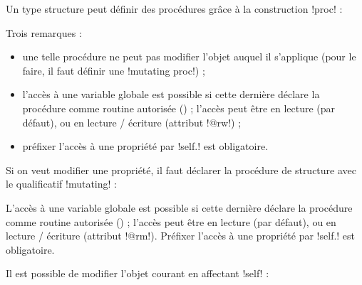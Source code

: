 
Un type structure peut définir des procédures grâce à la construction \plm!proc! :


Trois remarques :
\begin{itemize}
  \item une telle procédure ne peut pas modifier l'objet auquel il s'applique (pour le faire, il faut définir une \plm!mutating proc!) ;
  \item l'accès à une variable globale est possible si cette dernière déclare la procédure comme routine autorisée () ; l'accès peut être en lecture (par défaut), ou en lecture / écriture (attribut \plm!@rw!) ;
  \item préfixer l'accès à une propriété par \plm!self.! est obligatoire. 
\end{itemize}





Si on veut modifier une propriété, il faut déclarer la procédure de structure avec le qualificatif \plm!mutating! :


L'accès à une variable globale est possible si cette dernière déclare la procédure comme routine autorisée () ; l'accès peut être en lecture (par défaut), ou en lecture / écriture (attribut \plm!@rm!). Préfixer l'accès à une propriété par \plm!self.! est obligatoire. 

Il est possible de modifier l'objet courant en affectant \plm!self! :


